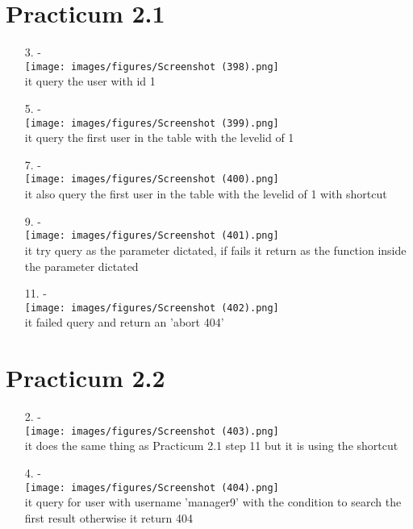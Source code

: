 \documentclass[12pt,titlepage]{article}
\begin{document}
\section{Practicum 2.1}
\begin{enumerate}
    \item[3.] - \\ \texttt{[image: images/figures/Screenshot (398).png]} \\ it query the user with id 1
    \item[5.] - \\ \texttt{[image: images/figures/Screenshot (399).png]} \\ it query the first user in the table with the level\textunderscore id of 1
    \item[7.] - \\ \texttt{[image: images/figures/Screenshot (400).png]} \\ it also query the first user in the table with the level\textunderscore id of 1 with shortcut
    \item[9.] - \\ \texttt{[image: images/figures/Screenshot (401).png]} \\ it try query as the parameter dictated, if fails it return as the function inside the parameter dictated
    \item[11.] - \\ \texttt{[image: images/figures/Screenshot (402).png]} \\ it failed query and return an 'abort 404'
\end{enumerate}

\section{Practicum 2.2}
\begin{enumerate}
    \item[2.] - \\ \texttt{[image: images/figures/Screenshot (403).png]} \\ it does the same thing as  Practicum 2.1 step 11 but it is using the shortcut
    \item[4.] - \\ \texttt{[image: images/figures/Screenshot (404).png]} \\ it query for user with username 'manager9' with the condition to search the first result otherwise it return 404
\end{enumerate}
\end{document}

